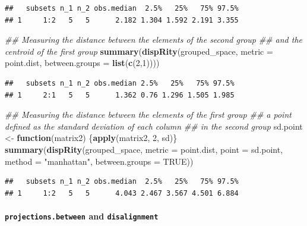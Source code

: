 \documentclass[
]{book}
\newenvironment{Shaded}{\begin{snugshade}}{\end{snugshade}}
\newcommand{\CommentTok}[1]{\textcolor[rgb]{0.56,0.35,0.01}{\textit{#1}}}
\newcommand{\ControlFlowTok}[1]{\textcolor[rgb]{0.13,0.29,0.53}{\textbf{#1}}}
\newcommand{\DataTypeTok}[1]{\textcolor[rgb]{0.13,0.29,0.53}{#1}}
\newcommand{\DecValTok}[1]{\textcolor[rgb]{0.00,0.00,0.81}{#1}}
\newcommand{\KeywordTok}[1]{\textcolor[rgb]{0.13,0.29,0.53}{\textbf{#1}}}
\newcommand{\NormalTok}[1]{#1}
\newcommand{\OtherTok}[1]{\textcolor[rgb]{0.56,0.35,0.01}{#1}}
\newcommand{\StringTok}[1]{\textcolor[rgb]{0.31,0.60,0.02}{#1}}
\begin{document}
\begin{verbatim}
##   subsets n_1 n_2 obs.median  2.5%   25%   75% 97.5%
## 1     1:2   5   5      2.182 1.304 1.592 2.191 3.355
\end{verbatim}

\begin{Shaded}
\begin{Highlighting}[]
\CommentTok{\#\# Measuring the distance between the elements of the second group}
\CommentTok{\#\# and the centroid of the first group}
\KeywordTok{summary}\NormalTok{(}\KeywordTok{dispRity}\NormalTok{(grouped\_space, }\DataTypeTok{metric =}\NormalTok{ point.dist,}
                 \DataTypeTok{between.groups =} \KeywordTok{list}\NormalTok{(}\KeywordTok{c}\NormalTok{(}\DecValTok{2}\NormalTok{,}\DecValTok{1}\NormalTok{))))}
\end{Highlighting}
\end{Shaded}

\begin{verbatim}
##   subsets n_1 n_2 obs.median 2.5%   25%   75% 97.5%
## 1     2:1   5   5      1.362 0.76 1.296 1.505 1.985
\end{verbatim}

\begin{Shaded}
\begin{Highlighting}[]
\CommentTok{\#\# Measuring the distance between the elements of the first group}
\CommentTok{\#\# a point defined as the standard deviation of each column}
\CommentTok{\#\# in the second group}
\NormalTok{sd.point \textless{}{-}}\StringTok{ }\ControlFlowTok{function}\NormalTok{(matrix2) \{}\KeywordTok{apply}\NormalTok{(matrix2, }\DecValTok{2}\NormalTok{, sd)\}}
\KeywordTok{summary}\NormalTok{(}\KeywordTok{dispRity}\NormalTok{(grouped\_space, }\DataTypeTok{metric =}\NormalTok{ point.dist,}
                 \DataTypeTok{point =}\NormalTok{ sd.point, }\DataTypeTok{method =} \StringTok{"manhattan"}\NormalTok{,}
                 \DataTypeTok{between.groups =} \OtherTok{TRUE}\NormalTok{))}
\end{Highlighting}
\end{Shaded}

\begin{verbatim}
##   subsets n_1 n_2 obs.median  2.5%   25%   75% 97.5%
## 1     1:2   5   5      4.043 2.467 3.567 4.501 6.884
\end{verbatim}

\hypertarget{projections.between-and-disalignment}{%
\paragraph{\texorpdfstring{\texttt{projections.between} and \texttt{disalignment}}{projections.between and disalignment}}\label{projections.between-and-disalignment}}
\end{document}

